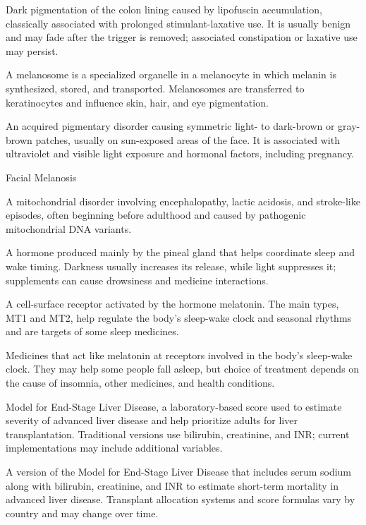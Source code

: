  Dark pigmentation of the colon lining caused by lipofuscin accumulation, classically associated with prolonged stimulant-laxative use. It is usually benign and may fade after the trigger is removed; associated constipation or laxative use may persist.

 A melanosome is a specialized organelle in a melanocyte in which melanin is synthesized, stored, and transported. Melanosomes are transferred to keratinocytes and influence skin, hair, and eye pigmentation.

 An acquired pigmentary disorder causing symmetric light- to dark-brown or gray-brown patches, usually on sun-exposed areas of the face. It is associated with ultraviolet and visible light exposure and hormonal factors, including pregnancy.

\synonyms
Facial Melanosis

 A mitochondrial disorder involving encephalopathy, lactic acidosis, and stroke-like episodes, often beginning before adulthood and caused by pathogenic mitochondrial DNA variants.

 A hormone produced mainly by the pineal gland that helps coordinate sleep and wake timing. Darkness usually increases its release, while light suppresses it; supplements can cause drowsiness and medicine interactions.

 A cell-surface receptor activated by the hormone melatonin. The main types, MT1 and MT2, help regulate the body's sleep-wake clock and seasonal rhythms and are targets of some sleep medicines.

 Medicines that act like melatonin at receptors involved in the body's sleep-wake clock. They may help some people fall asleep, but choice of treatment depends on the cause of insomnia, other medicines, and health conditions.

 Model for End-Stage Liver Disease, a laboratory-based score used to estimate severity of advanced liver disease and help prioritize adults for liver transplantation. Traditional versions use bilirubin, creatinine, and INR; current implementations may include additional variables.

 A version of the Model for End-Stage Liver Disease that includes serum sodium along with bilirubin, creatinine, and INR to estimate short-term mortality in advanced liver disease. Transplant allocation systems and score formulas vary by country and may change over time.

